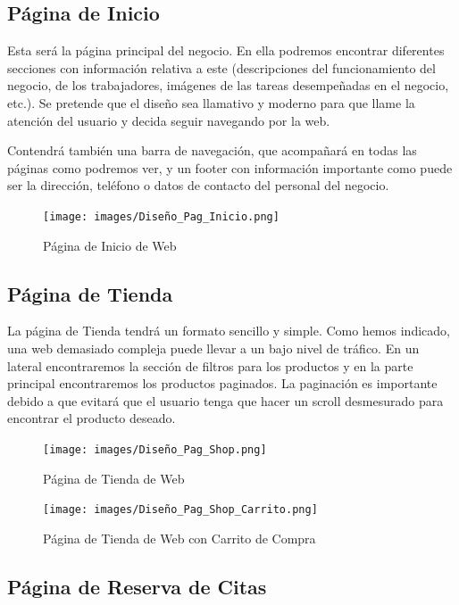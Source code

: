 \subsection{Página de Inicio}

Esta será la página principal del negocio. En ella podremos encontrar diferentes secciones con información relativa a este (descripciones del funcionamiento del negocio, de los trabajadores, imágenes de las tareas desempeñadas en el negocio, etc.). Se pretende que el diseño sea llamativo y moderno para que llame la atención del usuario y decida seguir navegando por la web.

Contendrá también una barra de navegación, que acompañará en todas las páginas como podremos ver, y un footer con información importante como puede ser la dirección, teléfono o datos de contacto del personal del negocio.

\begin{figure}[H]
  \centering
  \texttt{[image: images/Diseño\_Pag\_Inicio.png]}
  \caption{Página de Inicio de Web}
  \label{}
\end{figure}

\subsection{Página de Tienda}

La página de Tienda tendrá un formato sencillo y simple. Como hemos indicado, una web demasiado compleja puede llevar a un bajo nivel de tráfico. En un lateral encontraremos la sección de filtros para los productos y en la parte principal encontraremos los productos paginados. La paginación es importante debido a que evitará que el usuario tenga que hacer un scroll desmesurado para encontrar el producto deseado.

\begin{figure}[H]
  \centering
  \texttt{[image: images/Diseño\_Pag\_Shop.png]}
  \caption{Página de Tienda de Web}
  \label{}
\end{figure}

\begin{figure}[H]
  \centering
  \texttt{[image: images/Diseño\_Pag\_Shop\_Carrito.png]}
  \caption{Página de Tienda de Web con Carrito de Compra}
  \label{}
\end{figure}

\subsection{Página de Reserva de Citas}

